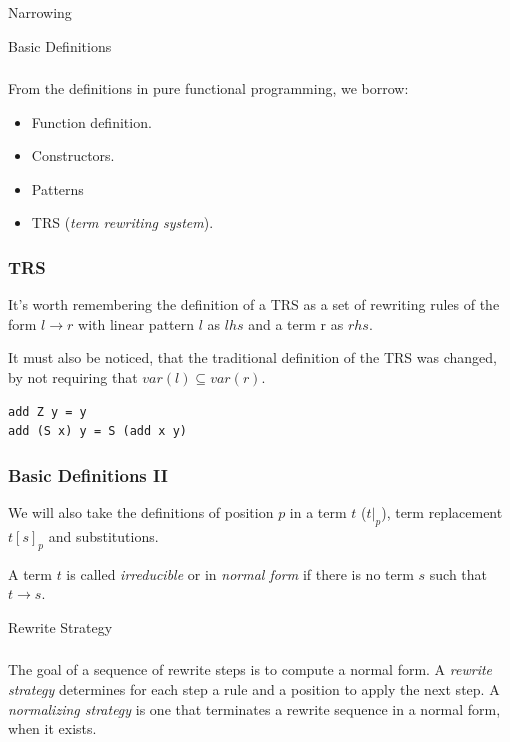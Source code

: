 \documentclass{beamer}
\begin{document}
\begin{section}{Narrowing}
  \begin{subsection}{Basic Definitions}
\begin{frame}
\frametitle{\subsecname}
  From the definitions in pure functional programming, we borrow:
  \begin{itemize}
    \item Function definition.
    \item Constructors.
    \item Patterns
    \item TRS (\textit{term rewriting system}).
  \end{itemize}


\end{frame}

\begin{frame}
[fragile]
\frametitle{TRS}
 It's worth remembering the definition of a TRS as a set of rewriting rules of the form $l \rightarrow r$ with linear pattern $l$ as $lhs$ and a term r as $rhs$.

  It must also be noticed, that the traditional definition of the TRS was changed, by not requiring that $var(l) \subseteq var(r)$.

\begin{example}
\begin{verbatim}
add Z y = y
add (S x) y = S (add x y)
\end{verbatim}
\end{example}

\end{frame}

\begin{frame}
[fragile]

\frametitle{Basic Definitions II}
  We will also take the definitions of position $p$ in a term $t$ ($t|_p$), term replacement $t[s]_p$ and substitutions.

\bigskip
  A term $t$ is called \textit{irreducible} or in \textit{normal form} if there is no term $s$ such that $t \rightarrow s$.
\end{frame}
\end{subsection}

\begin{subsection}{Rewrite Strategy}

  \begin{frame}
\frametitle{\subsecname}
  The goal of a sequence of rewrite steps is to compute a normal form. A \textit{rewrite strategy} determines for each step a rule and a position to apply the next step. A \textit{normalizing strategy} is one that terminates a rewrite sequence in a normal form, when it exists.
\end{frame}


\end{subsection}
\end{section}
\end{document}
